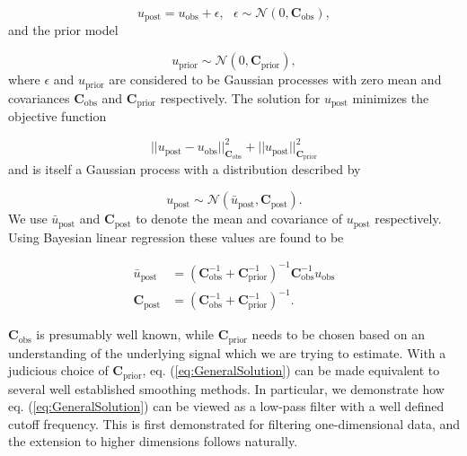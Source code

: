 \documentclass[10pt,a4paper]{article}
\begin{document}
\begin{equation}\label{eq:Data}
  u_\mathrm{post} = u_\mathrm{obs} + \epsilon,\ \ \ \epsilon \sim \mathcal{N}(0,\mathbf{C}_\mathrm{obs}),
\end{equation}
and the prior model

\begin{equation}\label{eq:Prior}
  u_\mathrm{prior} \sim \mathcal{N}(0,\mathbf{C}_\mathrm{prior}),
\end{equation}
where $\epsilon$ and $u_\mathrm{prior}$ are considered to be Gaussian processes with zero mean and covariances $\mathbf{C}_\mathrm{obs}$ and $\mathbf{C}_\mathrm{prior}$ respectively.  The solution for $u_\mathrm{post}$ minimizes the objective function  

\begin{equation}\label{eq:Objective}
||u_\mathrm{post} - u_\mathrm{obs}||_{\mathbf{C}_\mathrm{obs}}^2 + 
||u_\mathrm{post}||_{\mathbf{C}_\mathrm{prior}}^2
\end{equation}
and is itself a Gaussian process with a distribution described by

\begin{equation}
  u_\mathrm{post} \sim \mathcal{N}(\bar{u}_\mathrm{post},\mathbf{C}_\mathrm{post}).
\end{equation}
We use $\bar{u}_\mathrm{post}$ and $\mathbf{C}_\mathrm{post}$ to denote the mean and covariance of $u_\mathrm{post}$ respectively.  Using Bayesian linear regression \citep[e.g.][]{Tarantola2005} these values are found to be  

\begin{equation}\label{eq:GeneralSolution}
\begin{split}
  \bar{u}_\mathrm{post} &= (\mathbf{C}_\mathrm{obs}^{-1} + 
                            \mathbf{C}_\mathrm{prior}^{-1})^{-1}
                            \mathbf{C}_\mathrm{obs}^{-1} u_\mathrm{obs}
\\
\mathbf{C}_\mathrm{post} &= (\mathbf{C}_\mathrm{obs}^{-1} + 
                             \mathbf{C}_\mathrm{prior}^{-1})^{-1}.                          
\end{split}
\end{equation}
 
$\mathbf{C}_\mathrm{obs}$ is presumably well known, while $\mathbf{C}_\mathrm{prior}$ needs to be chosen based on an understanding of the underlying signal which we are trying to estimate.  With a judicious choice of $\mathbf{C}_\mathrm{prior}$,  eq. (\ref{eq:GeneralSolution}) can be made equivalent to several well established smoothing methods.  In particular, we demonstrate how eq. (\ref{eq:GeneralSolution}) can be viewed as a low-pass filter with a well defined cutoff frequency. This is first demonstrated for filtering one-dimensional data, and the extension to higher dimensions follows naturally.  
\end{document}
